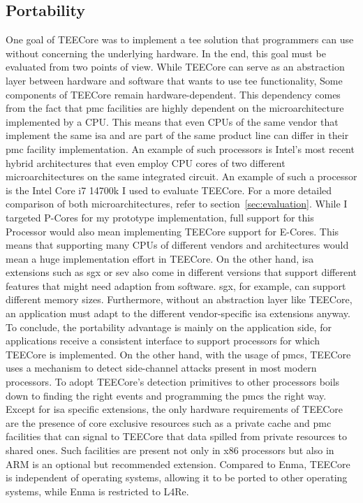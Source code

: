 \subsection{Portability}
\label{eval:compare:portability}
One goal of TEECore was to implement a \gls{tee} solution that programmers can
use without concerning the underlying hardware. In the end, this goal must be
evaluated from two points of view. While TEECore can serve as an abstraction
layer between hardware and software that wants to use \gls{tee} functionality,
Some components of TEECore remain hardware-dependent. This dependency comes from
the fact that \gls{pmc} facilities are highly dependent on the microarchitecture
implemented by a CPU. This means that even CPUs of the same vendor that
implement the same \gls{isa} and are part of the same product line can differ in
their \gls{pmc} facility implementation. An example of such processors is
Intel's most recent hybrid architectures that even employ CPU cores of two
different microarchitectures on the same integrated circuit. An example of such
a processor is the Intel Core i7 14700k I used to evaluate TEECore. For a more
detailed comparison of both microarchitectures, refer to
section~\ref{sec:evaluation}. While I targeted P-Cores for my prototype
implementation, full support for this Processor would also mean implementing
TEECore support for E-Cores. This means that supporting many CPUs of different
vendors and architectures would mean a huge implementation effort in TEECore. On
the other hand, \gls{isa} extensions such as \gls{sgx} or \gls{sev} also come in
different versions that support different features that might need adaption from
software. \gls{sgx}, for example, can support different memory sizes.
Furthermore, without an abstraction layer like TEECore, an application must
adapt to the different vendor-specific \gls{isa} extensions anyway. To conclude,
the portability advantage is mainly on the application side, for applications
receive a consistent interface to support processors for which TEECore is
implemented. On the other hand, with the usage of \glspl{pmc}, TEECore uses a
mechanism to detect side-channel attacks present in most modern processors. To
adopt TEECore's detection primitives to other processors boils down to finding
the right events and programming the \glspl{pmc} the right way. Except for
\gls{isa} specific extensions, the only hardware requirements of TEECore are the
presence of core exclusive resources such as a private cache and \gls{pmc}
facilities that can signal to TEECore that data spilled from private resources
to shared ones. Such facilities are present not only in x86 processors but also
in ARM is an optional but recommended extension. Compared to Enma, TEECore is
independent of operating systems, allowing it to be ported to other operating
systems, while Enma is restricted to L4Re.

